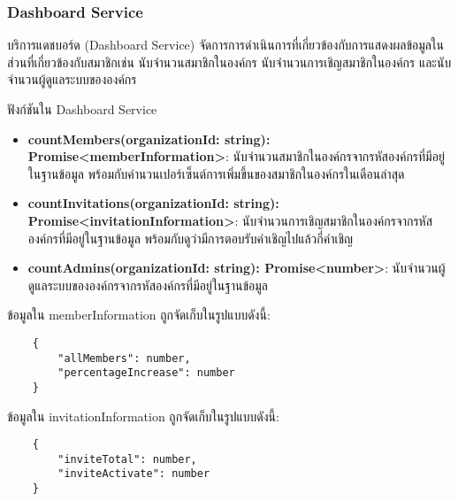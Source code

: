 \subsubsection{Dashboard Service}
\ifenglish
\else
บริการแดชบอร์ด (Dashboard Service) จัดการการดำเนินการที่เกี่ยวข้องกับการแสดงผลข้อมูลในส่วนที่เกี่ยวข้องกับสมาชิกเช่น นับจำนวนสมาชิกในองค์กร นับจำนวนการเชิญสมาชิกในองค์กร และนับจำนวนผู้ดูแลระบบขององค์กร

ฟังก์ชันใน Dashboard Service

\begin{itemize}
    \item \textbf{countMembers(organizationId: string): Promise<memberInformation>}: นับจำนวนสมาชิกในองค์กรจากรหัสองค์กรที่มีอยู่ในฐานข้อมูล พร้อมกับคำนวนเปอร์เซ็นต์การเพิ่มขึ้นของสมาชิกในองค์กรในเดือนล่าสุด
    \item \textbf{countInvitations(organizationId: string): Promise<invitationInformation>}: นับจำนวนการเชิญสมาชิกในองค์กรจากรหัสองค์กรที่มีอยู่ในฐานข้อมูล พร้อมกับดูว่ามีการตอบรับคำเชิญไปแล้วกี่คำเชิญ
    \item \textbf{countAdmins(organizationId: string): Promise<number>}: นับจำนวนผู้ดูแลระบบขององค์กรจากรหัสองค์กรที่มีอยู่ในฐานข้อมูล
\end{itemize}

ข้อมูลใน memberInformation ถูกจัดเก็บในรูปแบบดังนี้:
\begin{lstlisting}
    {
        "allMembers": number,
        "percentageIncrease": number
    }
\end{lstlisting}

ข้อมูลใน invitationInformation ถูกจัดเก็บในรูปแบบดังนี้:
\begin{lstlisting}
    {
        "inviteTotal": number,
        "inviteActivate": number
    }
\end{lstlisting}
\fi

\clearpage